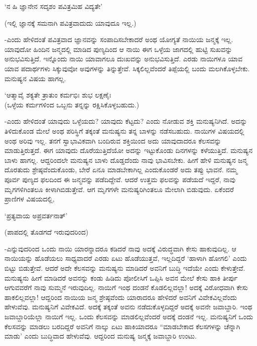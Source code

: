 \begin{shloka}
`ನ ಹಿ ಜ್ಞಾನೇನ ಸದೃಶಂ ಪವಿತ್ರಮಿಹ ವಿದ್ಯತೇ'
\end{shloka}

(ಇಲ್ಲಿ ಜ್ಞಾನಕ್ಕೆ ಸಮನಾಗಿ ಪವಿತ್ರವಾದುದು ಯಾವುದೂ ಇಲ್ಲ.)

-ಎಂದು ಹೇಳಿದಂತೆ ಪವಿತ್ರವಾದ ಜ್ಞಾನವನ್ನು ಸಂಪಾದಿಸಬೇಕಾದರೆ ಅಂಥ ಯೋಗ್ಯತೆ ನಾಯಿಯ ಜನ್ಮಕ್ಕೆ ಇಲ್ಲ. ಯಾವುದೋ ಹಿಂದಿನ ಜನ್ಮದಲ್ಲಿ ಮಾಡಿದ ಪುಣ್ಯದಿಂದ ಆ ನಾಯಿ ಈಗ ಒಳ್ಳೆಯ ಜಾಗದಲ್ಲಿ ಹುಟ್ಟಿ ಸುಖವನ್ನು ಅನುಭವಿಸುತ್ತಿದೆ. ಇನ್ನೊಂದು ನಾಯಿ ಯಾವಾಗಲೂ ದುಃಖವನ್ನು ಅನುಭವಿಸುತ್ತಿದೆ. ಎರಡು ನಾಯಿಗಳೂ ಯಾವ ಯಾವ ಪದಾರ್ಥಗಳು ಸಿಕ್ಕುವುವೋ ಅವುಗಳನ್ನು ತಿನ್ನುತ್ತೇವೆ. ಸಿಕ್ಕಲಿಲ್ಲವೆಂದರೆ ತಿಪ್ಪೆಯಲ್ಲಿ ಬಂದು ಮಲಗಿಕೊಳ್ಳಬೇಕು. ಮನುಷ್ಯನ ವಿಷಯ ಹಾಗಲ್ಲ.

\begin{shloka}
`ಆತ್ಮಾವೈ ಶಕ್ಯತೇ ತ್ರಾತುಂ ಕರ್ಮಭಿಃ ಶುಭ ಲಕ್ಷಣೈಃ\\
(ಒಳ್ಳೆಯ ಕರ್ಮಗಳಿಂದ ಒಬ್ಬನು ತನ್ನನ್ನು ರಕ್ಷಿಸಿಕೊಳ್ಳಬಹುದು.)
\end{shloka}

-ಎಂದು ಹೇಳಿದಂತೆ ಯಾವುದು ಒಳ್ಳೆಯದು? ಯಾವುದು ಕೆಟ್ಟದು? ಎಂದು ನೋಡುವ ಶಕ್ತಿ ಮನುಷ್ಯನಿಗಿದೆ. ಅದನ್ನು ತಿಳಿದುಕೊಂಡ ಮೇಲೆ ಅಂಥ ಪರಿಸ್ಥಿಗೆ ತಕ್ಕಂತೆ ಮನುಷ್ಯನು ತನ್ನ ಬಾಳನ್ನು ನಡೆಸಬಹುದು. ನಾಯಿಗಳ ವಿಷಯದಲ್ಲಿ ಅಂಥ ಅರಿವು ಇಲ್ಲ. ತನಗೆ ಸ್ವಾಭಾವಿಕವಾಗಿ ಬಂದಿರುವ ಶಕ್ತಿಯಿಂದ ಅದು ಯಾವುದಾದರೂ ಕೆಲಸವನ್ನು ಮಾಡುತ್ತಿರುತ್ತದೆ. ಈಗ ಯಾವುದು ದೊರೆಯುತ್ತಿದೆಯೋ ಅದನ್ನು ಇಟ್ಟುಕೊಂಡು ದಿನಗಳನ್ನು ಕಳೆಯುತ್ತಿದೆ. ಮನುಷ್ಯನ ಬಾಳು ಹಾಗಲ್ಲ. ಆದ್ದರಿಂದಲೇ ಮನುಷ್ಯನ ಬಾಳು ದೊಡ್ಡದೆಂದು ನಾವು ಭಾವಿಸಬೇಕು. ಹೀಗೆ ಹೇಳಿ ಮನುಷ್ಯನ ಜನ್ಮ ದೊರತುದು ಶ್ರೇಷ್ಠವೆಂದುಕೊಂಡು, ಬೇರೆ ಏನೂ ಮಾಡಬೇಕಾಗಿಲ್ಲ ಎಂದುಕೊಂಡರೆ ಅದು ತಪ್ಪು ಭಾವನೆ. ನಮ್ಮ ಪೂರ್ವ ಪುಣ್ಯದ ಫಲದಿಂದ ಈ ಜನ್ಮವನ್ನು ಪಡೆದಿದ್ದೇವೆ. ಆದರೆ ಉತ್ತಮ ಫಲವನ್ನು ಪಡೆಯದೆ ಇದ್ದರೆ, ನಾವು ಮೃಗಗಳಿಗಿಂತಲೂ ಕೀಳಾಗಿಬಿಡುತ್ತೇವೆ. ಆಗ ಮೃಗಗಳೇ ಮನುಷ್ಯರಿಗಿಂತಲೂ ಮೇಲಾಗಿ ಬಿಡುವುದು. ಏಕೆಂದರೆ ಪ್ರಾಣಿಗಳ ವಿಷಯದಲ್ಲಿ,

\begin{shloka}
`ಪ್ರತ್ಯವಾಯ ಅಪ್ರವರ್ತನಾತ್'
\end{shloka}

(ಪಾಪದಲ್ಲಿ ತೊಡಗದೆ ಇರುವುದರಿಂದ)

-ಎನ್ನುವುದರಿಂದ ಒಂದು ನಾಯಿ ಯಾರನ್ನಾದರೂ ಕಡಿದರೆ ನಾವು ಅದಕ್ಕೆ ವಿರುದ್ಧವಾಗಿ ಕೇಸು ಹಾಕುವುದಿಲ್ಲ. ಆ ನಾಯಿಯನ್ನು ಹೊಡೆಯಲು ಸಾಧ್ಯವಾದರೆ ಎರಡು ಏಟು ಹೊಡೆಯುತ್ತವೆ, ಇಲ್ಲದಿದ್ದರೆ `ಹಾಳಾಗಿ ಹೋಗಲಿ' ಎಂದು ಬಿಟ್ಟು ಬಿಡುತ್ತೇವೆ. ಆದರೆ ಅದೇ ಕೆಲಸವನ್ನು ಮನುಷ್ಯನು ಮಾಡಿದರೆ ಅವನಿಗೆ ಬುದ್ಧಿ ಇದೆಯೇ ಎಂದು ಕೇಳುತ್ತೇವೆ. ಮನುಷ್ಯನು ಹೀಗೆ ಮಾಡಿದರೆ ಅವನನ್ನು ಕಂಡು ಹಿಡಿದು ಪೋಲೀಸಿಗೆ ಒಪ್ಪಿಸಿ ಅವನ ಮೇಲೆ ಕೇಸು ಹಾಕಿ ತೀರ್ಪು ಆಗುವವರೆಗೆ ನಾವು ಸುಮ್ಮನೆ ಇರುವುದಿಲ್ಲ. ನಾಯಿಗೆ ಇಂಥ ದಂಡನೆ ಕೊಡಲಿಲ್ಲವಲ್ಲಾ! ಅದಕ್ಕೆ ವಿರೋಧವಾಗಿ ಕೇಸು ಹಾಕಲಿಲ್ಲವಲ್ಲಾ! ಆದ್ದರಿಂದ ನಾಯಿಯ ಜನ್ಮ ಶ್ರೇಷ್ಠವೆಂದು ಯಾರಾದರೂ ಹೇಳಿದರೆ ಅವನಿಗೆ ವಿವೇಕವಿಲ್ಲವೆಂದು ಹೇಳುವೆವು. ಮನುಷ್ಯನಿಗೆ ವಿವೇಕವಿದೆ. ಅದಕ್ಕೆ ತಕ್ಕಂತೆ ಅವನು ನಡೆದುಕೊಳ್ಳದಿದ್ದರೆ ಅದಕ್ಕೆ ಅವನೇ ಜವಾಬ್ದಾರಿ. ಇಂಥ ಜವಾಬ್ದಾರಿಯೆಲ್ಲಾ ನಾಯಿಗೆ ಇಲ್ಲ. ಒಂದು ಕೆಲಸವನ್ನು ಮಾಡಲಿಲ್ಲವೆಂದರೆ ಅದಕ್ಕೆ ದಂಡನೆ ಇಲ್ಲ. ಮನುಷ್ಯನಿಗೆ ಒಂದು ಕೆಲಸವನ್ನು ಮಾಡಲು ಬರದಿದ್ದರೆ ಅವನಿಗೆ ನಾಲ್ಕು ಏಟು ಹಾಕಿಯಾದರೂ ``ಮಾಡಬೇಕಾದ ಕೆಲಸಗಳನ್ನು ಚೆನ್ನಾಗಿ ಮಾಡು' ಎಂದು ಬುದ್ಧಿವಾದ ಹೇಳುವೆವು. ಆದ್ದರಿಂದ ಮನುಷ್ಯ ಜನ್ಮಕ್ಕೆ ಜವಾಬ್ದಾರಿ ಉಂಟು.

